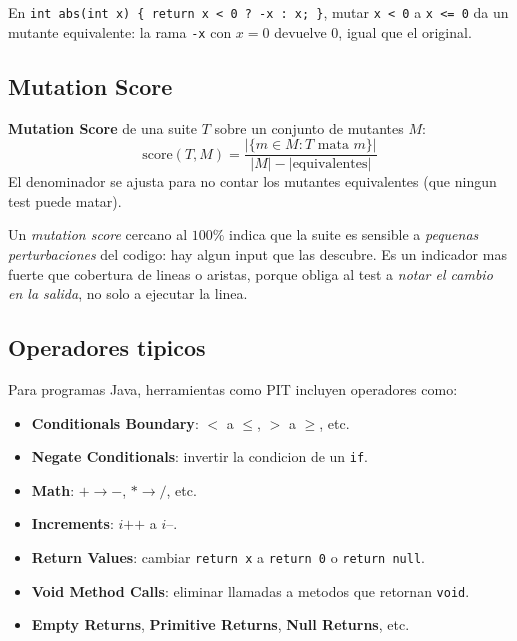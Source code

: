 \documentclass[12pt,a4paper]{article}
\begin{document}
\begin{ejemplobox}
En \texttt{int abs(int x) \{ return x < 0 ? -x : x; \}}, mutar \texttt{x < 0} a
\texttt{x <= 0} da un mutante equivalente: la rama \texttt{-x} con $x = 0$ devuelve $0$, igual
que el original.
\end{ejemplobox}

\subsection{Mutation Score}

\begin{definicionbox}
\textbf{Mutation Score} de una suite $T$ sobre un conjunto de mutantes $M$:
\[
\text{score}(T, M) = \frac{|\{ m \in M : T \text{ mata } m \}|}{|M| - |\text{equivalentes}|}
\]
El denominador se ajusta para no contar los mutantes equivalentes (que ningun test puede
matar).
\end{definicionbox}

\begin{ideabox}
Un \emph{mutation score} cercano al $100\%$ indica que la suite es sensible a
\emph{pequenas perturbaciones} del codigo: hay algun input que las descubre. Es un indicador
mas fuerte que cobertura de lineas o aristas, porque obliga al test a \emph{notar el cambio en
la salida}, no solo a ejecutar la linea.
\end{ideabox}

\subsection{Operadores tipicos}

Para programas Java, herramientas como PIT incluyen operadores como:

\begin{itemize}
  \item \textbf{Conditionals Boundary}: $<$ a $\le$, $>$ a $\ge$, etc.
  \item \textbf{Negate Conditionals}: invertir la condicion de un \texttt{if}.
  \item \textbf{Math}: $+ \to -$, $* \to /$, etc.
  \item \textbf{Increments}: $i\texttt{++}$ a $i\texttt{--}$.
  \item \textbf{Return Values}: cambiar \texttt{return x} a \texttt{return 0} o
  \texttt{return null}.
  \item \textbf{Void Method Calls}: eliminar llamadas a metodos que retornan \texttt{void}.
  \item \textbf{Empty Returns}, \textbf{Primitive Returns}, \textbf{Null Returns}, etc.
\end{itemize}
\end{document}
